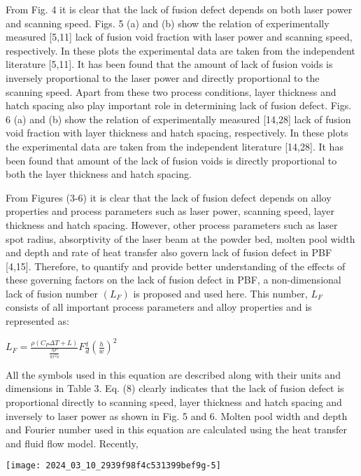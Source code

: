 \documentclass[10pt]{article}
\begin{document}
From Fig. 4 it is clear that the lack of fusion defect depends on both laser power and scanning speed. Figs. 5 (a) and (b) show the relation of experimentally measured [5,11] lack of fusion void fraction with laser power and scanning speed, respectively. In these plots the experimental data are taken from the independent literature [5,11]. It has been found that the amount of lack of fusion voids is inversely proportional to the laser power and directly proportional to the scanning speed. Apart from these two process conditions, layer thickness and hatch spacing also play important role in determining lack of fusion defect. Figs. 6 (a) and (b) show the relation of experimentally measured [14,28] lack of fusion void fraction with layer thickness and hatch spacing, respectively. In these plots the experimental data are taken from the independent literature [14,28]. It has been found that amount of the lack of fusion voids is directly proportional to both the layer thickness and hatch spacing.

From Figures (3-6) it is clear that the lack of fusion defect depends on alloy properties and process parameters such as laser power, scanning speed, layer thickness and hatch spacing. However, other process parameters such as laser spot radius, absorptivity of the laser beam at the powder bed, molten pool width and depth and rate of heat transfer also govern lack of fusion defect in PBF [4,15]. Therefore, to quantify and provide better understanding of the effects of these governing factors on the lack of fusion defect in PBF, a non-dimensional lack of fusion number $\left(L_{F}\right)$ is proposed and used here. This number, $L_{F}$ consists of all important process parameters and alloy properties and is represented as:

$L_{F}=\frac{\rho\left(C_{P} \Delta T+L\right)}{\frac{\eta P}{\pi r^{2} v}} F \frac{t}{d}\left(\frac{h}{w}\right)^{2}$

All the symbols used in this equation are described along with their units and dimensions in Table 3. Eq. (8) clearly indicates that the lack of fusion defect is proportional directly to scanning speed, layer thickness and hatch spacing and inversely to laser power as shown in Fig. 5 and 6. Molten pool width and depth and Fourier number used in this equation are calculated using the heat transfer and fluid flow model. Recently,

\begin{center}
\texttt{[image: 2024\_03\_10\_2939f98f4c531399bef9g-5]}
\end{center}
\end{document}
